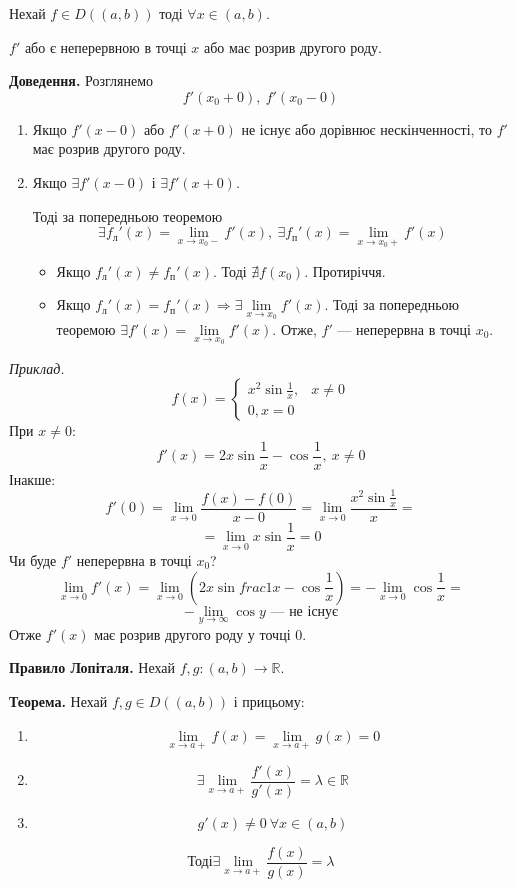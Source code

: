 \documentclass[12pt]{report}
\begin{document}
Нехай $f \in D((a,b))$ тоді $\forall x \in (a,b)$.

$f'$ або є неперервною в точці $x$ або має розрив другого роду.

\textbf{Доведення.} Розглянемо
$$f'(x_0+0),\ f'(x_0-0)$$
\begin{enumerate}
\item Якщо $f'(x - 0)$ або $f'(x + 0)$ не існує або дорівнює нескінченності, то $f'$ має розрив другого роду.

\item Якщо $\exists f'(x - 0)$ і $\exists f'(x + 0)$.

Тоді за попередньою теоремою
$$\exists f_{\textrm{л}}'(x) = \lim_{x\to x_0-}f'(x),\ \exists f_{\textrm{п}}'(x) = \lim_{x\to x_0+}f'(x)$$

\begin{itemize}
\item Якщо $f_{\textrm{л}}'(x) \neq f_{\textrm{п}}'(x)$. Тоді $\nexists f(x_0)$. Протиріччя.
\item Якщо $f_{\textrm{л}}'(x) = f_{\textrm{п}}'(x) \Longrightarrow \exists \lim\limits_{x\to x_0} f'(x)$. Тоді за попередньою теоремою 
$\exists f'(x) = \lim\limits_{x \to x_0}f'(x)$. Отже, $f'$ --- неперервна в точці $x_0$. 
\end{itemize}
\end{enumerate}

\textit{Приклад.} 
$$f(x) = \begin{cases} x^2 \sin \frac{1}{x}, & x \neq 0 \\
				0, x = 0\end{cases}$$
При $x \neq 0$:
$$f'(x) = 2x \sin \frac{1}{x} - \cos \frac{1}{x},\ x\neq 0$$
Інакше:
$$f'(0) = \lim_{x \to 0}\frac{f(x) - f(0)}{x - 0} = \lim_{x\to 0}\frac{x^2 \sin \frac{1}{x}}{x} = $$
$$= \lim_{x\to 0}x \sin \frac{1}{x} = 0$$
Чи буде $f'$ неперервна в точці $x_0$?
$$\lim_{x \to 0}f'(x) = \lim_{x\to 0 }(2x \sin frac{1}{x} - \cos \frac{1}{x}) = -\lim_{x\to 0}\cos \frac{1}{x} = $$
$$-\lim_{y \to \infty} \cos y \textrm{ --- не існує}$$
Отже $f'(x)$ має розрив другого роду у точці $0$.

\textbf{Правило Лопіталя.} Нехай $f,g : (a,b) \to \mathbb{R}$.

\textbf{Теорема.} Нехай $f,g \in D((a,b))$ і прицьому:
\begin{enumerate}
\item $$\lim_{x\to a+}f(x) = \lim_{x \to a+}g(x) = 0$$ 
\item
$$\exists \lim_{x\to a+}\frac{f'(x)}{g'(x)} = \lambda \in \mathbb{R}$$
\item 
$$g'(x) \neq 0 \ \forall x \in (a,b)$$
\end{enumerate}
$$\textrm{Тоді} \exists \lim_{x\to a+}\frac{f(x)}{g(x)} = \lambda$$
\end{document}
